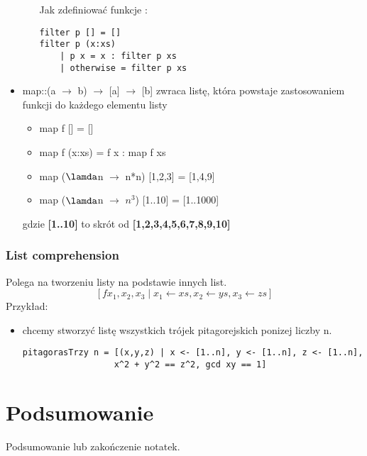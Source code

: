 \documentclass[11pt,a4paper]{article}
\begin{document}
\begin{itemize}
\begin{itemize}
                Jak zdefiniować funkcje :
                \begin{Verbatim}[frame=single]
filter p [] = []
filter p (x:xs)
    | p x = x : filter p xs
    | otherwise = filter p xs
                \end{Verbatim}
        \end{itemize}
    \item map::(a $\rightarrow$ b) $\rightarrow$ [a] $\rightarrow$ [b] \newline
        zwraca listę, która powstaje zastosowaniem funkcji do każdego elementu listy
        \begin{itemize}
            \item map f [] = []
            \item map f (x:xs) = f x : map f xs
            \item map ($\lamda$n $\rightarrow$ n*n) [1,2,3] = [1,4,9]
            \item map ($\lamda$n $\rightarrow$ $n^3$) [1..10] = [1..1000]
        \end{itemize}
        gdzie \textbf{[1..10]} to skrót od \textbf{[1,2,3,4,5,6,7,8,9,10]}
\end{itemize}

\subsubsection{List comprehension}
Polega na tworzeniu listy na podstawie innych list.
\[
    \boxed{[f x_1, x_2, x_3 \mid x_1 \leftarrow xs, x_2 \leftarrow ys, x_3 \leftarrow zs]}
\]
Przykład:
\begin{itemize}
    \item chcemy stworzyć listę wszystkich trójek pitagorejskich ponizej liczby n.
        \begin{Verbatim}[frame=single]
pitagorasTrzy n = [(x,y,z) | x <- [1..n], y <- [1..n], z <- [1..n],
                  x^2 + y^2 == z^2, gcd xy == 1]
        \end{Verbatim}
\end{itemize}



\section{Podsumowanie}
Podsumowanie lub zakończenie notatek.
\end{document}
